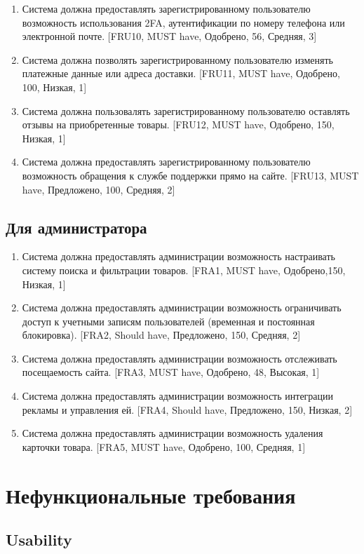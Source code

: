 \documentclass{article}
\begin{document}
\begin{enumerate}
    \item Система должна предоставлять зарегистрированному пользователю возможность использования 2FA, аутентификации по номеру телефона или электронной почте. [FRU10, MUST have, Одобрено, 56, Средняя, 3]
    \item Система должна позволять зарегистрированному пользователю изменять платежные данные или адреса доставки. [FRU11, MUST have, Одобрено, 100, Низкая, 1] 
    \item Система должна пользовалять зарегистрированному пользователю оставлять отзывы на приобретенные товары. [FRU12, MUST have, Одобрено, 150, Низкая, 1]
    \item Система должна предоставлять зарегистрированному пользователю возможность обращения к службе поддержки прямо на сайте. [FRU13, MUST have, Предложено, 100, Средняя, 2]
\end{enumerate}


\subsection{Для администратора}

\begin{enumerate}
    \item Система должна предоставлять администрации возможность настраивать систему поиска и фильтрации товаров. [FRA1, MUST have, Одобрено,150, Низкая, 1]
    \item Система должна предоставлять администрации возможность ограничивать доступ к учетными записям пользователей (временная и постоянная блокировка). [FRA2, Should have, Предложено, 150, Средняя, 2]
    \item Система должна предоставлять администрации возможность отслеживать посещаемость сайта. [FRA3, MUST have, Одобрено, 48, Высокая, 1]
    \item Система должна предоставлять администрации возможность интеграции рекламы и управления ей. [FRA4, Should have, Предложено, 150, Низкая, 2]
    \item Система должна предоставлять администрации возможность удаления карточки товара. [FRA5, MUST have, Одобрено, 100, Средняя, 1]
\end{enumerate}

\section{Нефункциональные требования}


\subsection{Usability}
\end{document}
